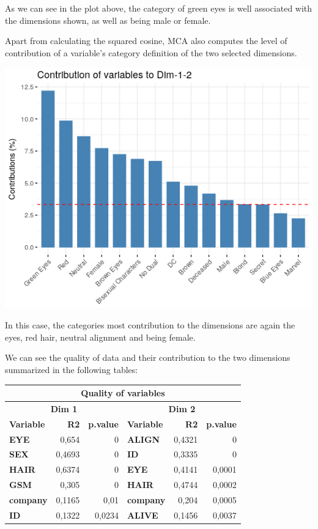 As we can see in the plot above, the category of green eyes is well associated with the dimensions shown, as well as being male or female.


Apart from calculating the squared cosine, MCA also computes the level of contribution of a variable's category definition of the two selected dimensions.


\begin{center}
   \includegraphics[scale=0.7]{img/contrib12.png}
\end{center}

In this case, the categories most contribution to the dimensions are again the eyes, red hair, neutral alignment and being female.



We can see the quality of data and their contribution to the two dimensions summarized in the following tables:

\begin{center}
  \begin{tabular*}{0.8\textwidth}{l@{\extracolsep{\fill}}rrlrr}
\multicolumn{6}{c}{\textbf{Quality of variables}} \\ \hline
\multicolumn{3}{c}{\textbf{Dim 1}} & \multicolumn{3}{c}{\textbf{Dim 2}} \\ \hline
\textbf{Variable} & \textbf{R2} & \multicolumn{1}{r|}{\textbf{p.value}} & \textbf{Variable} & \textbf{R2} & \textbf{p.value} \\ \hline
\textbf{EYE} & 0,654 & \multicolumn{1}{r|}{0} & \textbf{ALIGN} & 0,4321 & 0 \\
\textbf{SEX} & 0,4693 & \multicolumn{1}{r|}{0} & \textbf{ID} & 0,3335 & 0 \\
\textbf{HAIR} & 0,6374 & \multicolumn{1}{r|}{0} & \textbf{EYE} & 0,4141 & 0,0001 \\
\textbf{GSM} & 0,305 & \multicolumn{1}{r|}{0} & \textbf{HAIR} & 0,4744 & 0,0002 \\
\textbf{company} & 0,1165 & \multicolumn{1}{r|}{0,01} & \textbf{company} & 0,204 & 0,0005 \\
\textbf{ID} & 0,1322 & \multicolumn{1}{r|}{0,0234} & \textbf{ALIVE} & 0,1456 & 0,0037
\end{tabular*}

\end{center}

